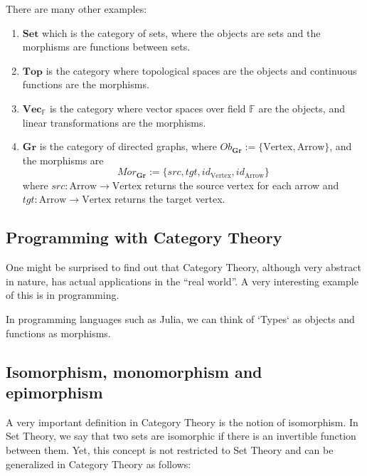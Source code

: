 There are many other examples:
\begin{enumerate}[1.]
	\item $\mathbf{Set}$ which is the category of sets, where the objects are sets and the morphisms are functions between sets.
	\item $\mathbf{Top}$ is the category where topological spaces are the objects and continuous functions are the morphisms.
	\item $\mathbf{Vec}_\mathbb F$ is the category where vector spaces over field $\mathbb F$ are the objects,
	      and linear transformations are the morphisms.
	\item $\mathbf{Gr}$ is the category of directed graphs, where $Ob_{\mathbf{Gr}} := \{\text{Vertex}, \text{Arrow}\}$,
	      and the morphisms are
	      \begin{displaymath}
		      Mor_{\mathbf{Gr}} := \{
		      src,
		      tgt,
		      id_{\text{Vertex}},
		      id_{\text{Arrow}}
		      \}
	      \end{displaymath}
	      where $src:\text{Arrow} \to \text{Vertex}$ returns the source vertex for each arrow and
	      $tgt:\text{Arrow} \to \text{Vertex}$ returns the target vertex.
\end{enumerate}


\subsection{Programming with Category Theory}

One might be surprised to find out that Category Theory,
although very abstract in nature, has actual applications in the
``real world''. A very interesting example of this is in programming.

In programming languages such as Julia, we can think of `Types`
as objects and functions as morphisms.

\subsection{Isomorphism, monomorphism and epimorphism}

A very important definition in Category Theory is the notion of isomorphism.
In Set Theory, we say that two sets are isomorphic if there is an invertible
function between them. Yet, this concept is not restricted to Set Theory
and can be generalized in Category Theory as follows:

